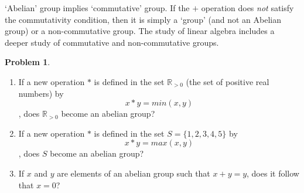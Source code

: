 \documentclass[english,notitlepage,smartquotes]{hgbreport}
\theoremstyle{definition}
\theoremstyle{definition}
\newtheorem{problem}{Problem}
\theoremstyle{remark}
\theoremstyle{definition}
\theoremstyle{plain}
\theoremstyle{definition}
\begin{document}
`Abelian' group implies `commutative' group. If the $+$ operation does \emph{not} satisfy the commutativity condition, then it is simply a `group' (and not an Abelian group) or a non-commutative group. The study of linear algebra includes a deeper study of commutative and non-commutative groups.

\begin{problem}
\label{pr:abelian}
\begin{enumerate}
\item If a new operation $*$ is defined in the set $\mathbb R_{> 0}$ (the set of positive real numbers) by
$$ 
x*y=min(x,y)
$$
, does $\mathbb R_{>0}$ become an abelian group?
\item If a new operation $*$ is defined in the set $S=\{1,2,3,4,5\}$ by
$$
x*y=max(x,y)
$$
, does $S$ become an abelian group?
\item\label{item:xyyx0p} If $x$ and $y$ are elements of an abelian group such that $x+y=y$, does it follow that $x = 0$?
\end{enumerate}

\end{problem}
\end{document}
